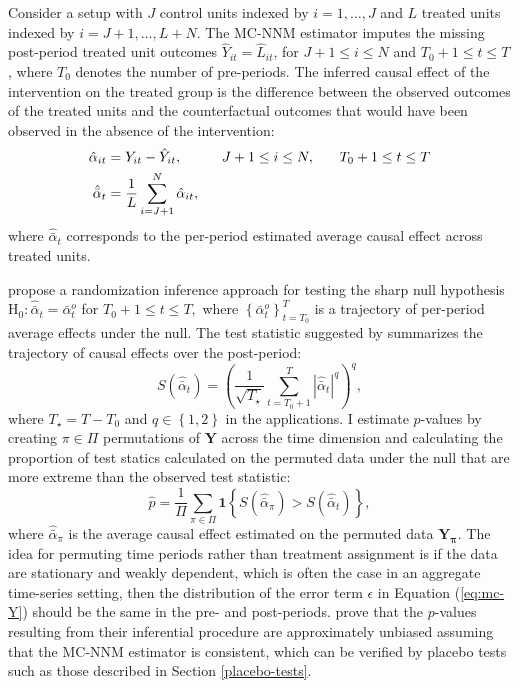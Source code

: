 \documentclass[12pt]{article}
\begin{document}
Consider a setup with $J$ control units indexed by $i=1, \ldots, J$ and $L$ treated units indexed by $i = J+1, \ldots, L+N$. The MC-NNM estimator imputes the missing post-period treated unit outcomes $\hat{Y}_{it} = \hat{L}_{it}$, for $J+1 \leq i \leq N$ and $T_0+1 \leq t \leq T$, where $T_0$ denotes the number of pre-periods. The inferred causal effect of the intervention on the treated group is the difference between the observed outcomes of the treated units and the counterfactual outcomes that would have been observed in the absence of the intervention:
%
\begin{align}
\hat{\alpha}_{it} &= Y_{it} - \hat{Y}_{it}, \hspace{10mm} J+1 \leq i \leq N, \, \hspace{5mm} \, T_0+1 \leq t \leq T \\ 
\hat{\bar{\alpha}}_{t} & = \frac{1}{L} \sum^{N}_{i=J+1} \hat{\alpha}_{it},  \label{eq:avg-pointwise}
\end{align}
%
where $\hat{\bar{\alpha}}_{t}$ corresponds to the per-period estimated average causal effect across treated units. 

\citet{chernozhukov2017exact} propose a randomization inference approach for testing the sharp null hypothesis $
\text{H}_0: \hat{\bar{\alpha}}_{t} = \bar{\alpha}^{o}_{t}$ for $T_0+1 \leq t \leq T,$
where $\left\{\bar{\alpha}^{o}_{t}\right\}_{t=T_0}^T$ is a trajectory of per-period average effects under the null. The test statistic suggested by \citet{chernozhukov2017exact} summarizes the trajectory of causal effects over the post-period:
%
\begin{equation} \label{tstat}
S (\hat{\bar{\alpha}}_{t}) = \left(\frac{1}{\sqrt{T_\star}} \sum_{t=T_0 +1}^{T} |\hat{\bar{\alpha}}_{t}|^q\right)^q,
\end{equation}
%
where $T_\star = T-T_0$ and $q \in \left\{1, 2\right\}$ in the applications. I estimate $p$-values by creating $\pi \in \Pi$ permutations of $\mathbf{Y}$ across the time dimension and calculating the proportion of test statics calculated on the permuted data under the null that are more extreme than the observed test statistic:
%
\begin{equation}
\hat{p} = \frac{1}{\Pi} \sum_{\pi \in \Pi} \textbf{1} \left\{S (\hat{\bar{\alpha}}_{\pi}) > S (\hat{\bar{\alpha}}_{t}) \right\}, \label{eq:pvalue}
\end{equation}
%
where $\hat{\bar{\alpha}}_{\pi}$ is the average causal effect estimated on the permuted data $\mathbf{Y_\pi}$. The idea for permuting time periods rather than treatment assignment is if the data are stationary and weakly dependent, which is often the case in an aggregate time-series setting, then the distribution of the error term $\epsilon$ in Equation (\ref{eq:mc-Y}) should be the same in the pre- and post-periods. \citet{chernozhukov2017exact} prove that the $p$-values resulting from their inferential procedure are approximately unbiased assuming that the MC-NNM estimator is consistent, which can be verified by placebo tests such as those described in Section \ref{placebo-tests}. 
\end{document}
